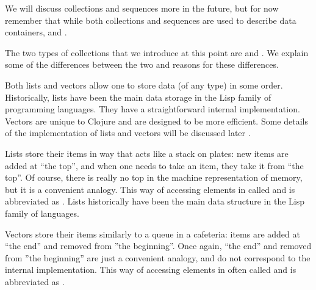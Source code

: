 We will discuss collections and sequences more in the future, but for now remember that while both collections and sequences are used to describe data containers,  and . 

The two types of collections that we introduce at this point are  and . We explain some of the differences between the two and reasons for these differences. 

Both lists and vectors allow one to store data (of any type) in some order. Historically, lists have been the main data storage in the Lisp family of programming languages. They have a straightforward internal implementation. Vectors are unique to Clojure and are designed to be more efficient. Some details of the implementation of lists and vectors will be discussed later . 

Lists store their items in way that acts like a stack on plates: new items are added at ``the top'', and when one needs to take an item, they take it from ``the top''.  Of course, there is really no top in the machine representation of memory, but it is a convenient analogy.  This way of accessing elements in called  and is abbreviated as . Lists historically have been the main data structure in the Lisp family of languages. 

Vectors store their items similarly to a queue in a cafeteria: items are added at ``the end'' and removed from ''the beginning''. Once again, ``the end'' and removed from ''the beginning'' are just a convenient analogy, and do not correspond to the internal implementation. This way of accessing elements in often called  and is abbreviated as . 

